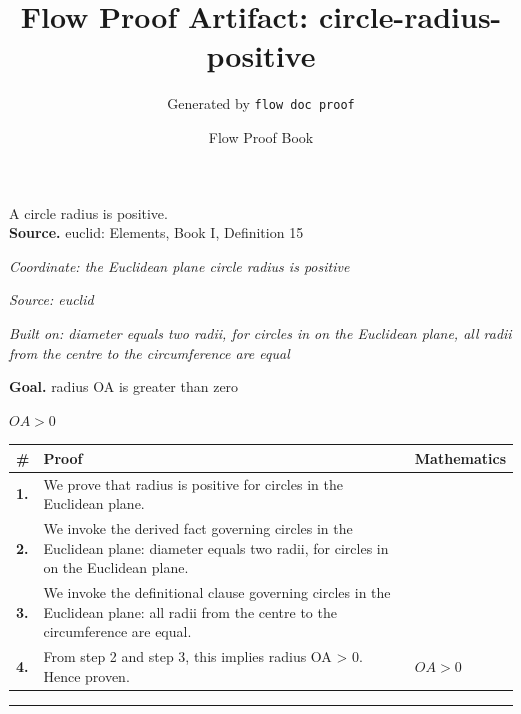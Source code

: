 \documentclass[11pt]{article}
\title{Flow Proof Artifact: circle-radius-positive}
\author{Generated by \texttt{flow doc proof}}
\date{Flow Proof Book}
\theoremstyle{definition}
\begin{document}
\maketitle
A circle radius is positive.\\[0.5em]
\textbf{Source.} euclid: Elements, Book I, Definition 15\\[0.5em]
\bigskip
{}\par
\smallskip\noindent\textit{Coordinate: the Euclidean plane \cdot circle \cdot radius is positive}\par
\smallskip\noindent\textit{Source: euclid}\par
\smallskip\noindent\textit{Built on: diameter equals two radii, for circles in on the Euclidean plane, all radii from the centre to the circumference are equal}\par
\medskip
\noindent\textbf{Goal.} radius OA is greater than zero\par
\noindent$\displaystyle OA > 0$\par
\medskip
\noindent
\begin{tabular}{@{} >{\raggedright\arraybackslash}p{} >{\raggedright\arraybackslash}p{} >{\raggedleft\arraybackslash}p{} @{}}
\textbf{\#} & \textbf{Proof} & \textbf{Mathematics} \\
\midrule
\textbf{1.} & We prove that radius is positive for circles in the Euclidean plane. & \\[0.45em]
\textbf{2.} & We invoke the derived fact governing circles in the Euclidean plane: diameter equals two radii, for circles in on the Euclidean plane. & \\[0.45em]
\textbf{3.} & We invoke the definitional clause governing circles in the Euclidean plane: all radii from the centre to the circumference are equal. & \\[0.45em]
\textbf{4.} & From step 2 and step 3, this implies radius OA > 0. Hence proven. & $\displaystyle OA > 0$ \\[0.45em]
\bottomrule
\end{tabular}
\label{thm:Geometry-circle-radius_is_positive}
\par\medskip\hrule
\end{document}
